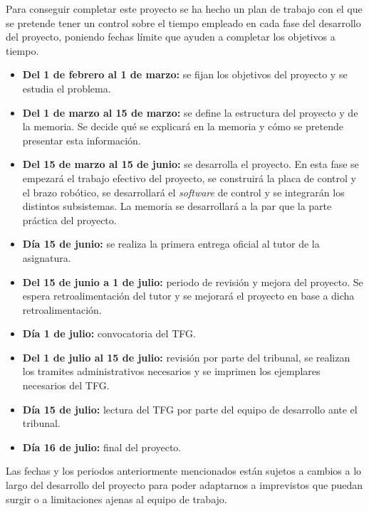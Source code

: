 Para conseguir completar este proyecto se ha hecho un plan de trabajo con el que se pretende tener un control sobre el tiempo empleado en cada fase del desarrollo del proyecto, poniendo fechas límite que ayuden a completar los objetivos a tiempo.

\begin{itemize}
    \item \textbf{Del 1 de febrero al 1 de marzo:} se fijan los objetivos del proyecto y se estudia el problema.
    \item \textbf{Del 1 de marzo al 15 de marzo:} se define la estructura del proyecto y de la memoria. Se decide qué se explicará en la memoria y cómo se pretende presentar esta información.
    \item \textbf{Del 15 de marzo al 15 de junio:} se desarrolla el proyecto. En esta fase se empezará el trabajo efectivo del proyecto, se construirá la placa de control y el brazo robótico, se desarrollará el \textit{software} de control y se integrarán los distintos subsistemas. La memoria se desarrollará a la par que la parte práctica del proyecto.
    \item \textbf{Día 15 de junio:} se realiza la primera entrega oficial al tutor de la asignatura.
    \item \textbf{Del 15 de junio a 1 de julio:} periodo de revisión y mejora del proyecto. Se espera retroalimentación del tutor y se mejorará el proyecto en base a dicha retroalimentación.
    \item \textbf{Día 1 de julio:} convocatoria del TFG.
    \item \textbf{Del 1 de julio al 15 de julio:} revisión por parte del tribunal, se realizan los tramites administrativos necesarios y se imprimen los ejemplares necesarios del TFG.
    \item \textbf{Día 15 de julio:} lectura del TFG por parte del equipo de desarrollo ante el tribunal.
    \item \textbf{Día 16 de julio:} final del proyecto.
\end{itemize}

Las fechas y los periodos anteriormente mencionados están sujetos a cambios a lo largo del desarrollo del proyecto para poder adaptarnos a imprevistos que puedan surgir o a limitaciones ajenas al equipo de trabajo.